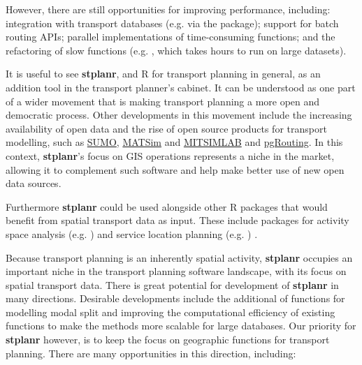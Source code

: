 However, there are still opportunities for improving performance, including:
integration with transport databases (e.g. via the  package);
support for batch routing APIs;
parallel implementations of time-consuming functions;
and the refactoring of slow functions (e.g. , which takes hours to run on large datasets).


It is useful to see \textbf{stplanr}, and R for transport planning in
general, as an addition tool in the transport planner's cabinet. It can
be understood as one part of a wider movement that is making transport
planning a more open and democratic process. Other developments in this
movement include the increasing availability of open data
\citep{naumova_building_2016} and the rise of open source products for
transport modelling, such as
\href{http://www.dlr.de/ts/en/desktopdefault.aspx/tabid-9883/16931_read-41000/}{SUMO},
\href{http://www.matsim.org/}{MATSim} and
\href{https://its.mit.edu/software/mitsimlab}{MITSIMLAB}
\citep{saidallah_comparative_2016} and
\href{http://pgrouting.org/}{pgRouting}.
In this context, \textbf{stplanr}'s focus on
GIS operations represents a niche in the market, allowing it to
complement such software and help make better use of new open data
sources.

Furthermore \textbf{stplanr} could be used alongside other R packages that
would benefit from spatial transport data as input.
These include packages for activity space analysis (e.g. ) and
service location planning (e.g. ) \citep{RJ-2017-020}.


Because transport planning is an inherently spatial activity,
\textbf{stplanr} occupies an important niche in the transport planning
software landscape, with its focus on spatial transport data. There is
great potential for development of \textbf{stplanr} in many directions.
Desirable developments include the additional of functions for modelling
modal split and improving the computational efficiency of
existing functions to make the methods more scalable for large
databases. Our priority for \textbf{stplanr} however, is to keep the
focus on geographic functions for transport planning. There are many
opportunities in this direction, including:

